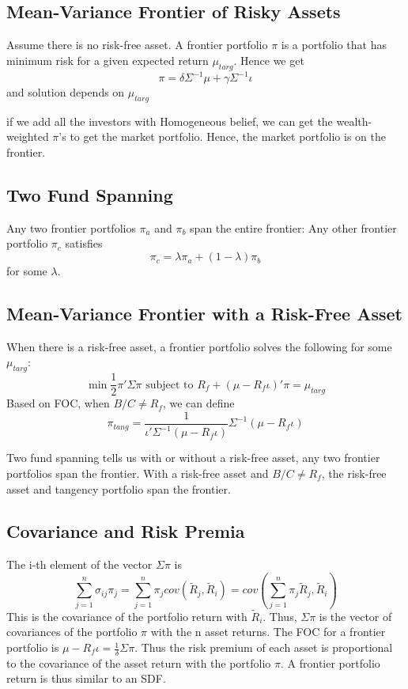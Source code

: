\documentclass[11pt, a4paper, oneside]{article}
\theoremstyle{definition}
\theoremstyle{proposition}
\theoremstyle{corollary}
\theoremstyle{lemma}
\theoremstyle{theorem}
\begin{document}
\subsection{Mean-Variance Frontier of Risky Assets}
Assume there is no risk-free asset. A frontier portfolio $\pi$ is a portfolio that has minimum risk for a given expected return $\mu_{targ}$. Hence we get
$$\pi = \delta\Sigma^{-1}\mu + \gamma \Sigma^{-1}\iota$$ and solution depends on $\mu_{targ}$

if we add all the investors with Homogeneous belief, we can get the wealth-weighted $\pi$'s to get the market portfolio. Hence, the market portfolio is on the frontier. 

\subsection{Two Fund Spanning}
Any two frontier portfolios $\pi_a$ and $\pi_b$ span the entire frontier: Any other frontier portfolio $\pi_c$ satisfies 
$$\pi_c = \lambda \pi_a + (1- \lambda) \pi_b$$
for some $\lambda$. 

\subsection{Mean-Variance Frontier with a Risk-Free Asset}
When there is a risk-free asset, a frontier portfolio solves the following for some $\mu_{targ}$:
$$\min \frac{1}{2}\pi'\Sigma\pi  \text{ subject to } R_f + (\mu - R_f\iota)'\pi = \mu_{targ}$$
Based on FOC, when $B/C \neq R_f$, we can define
$$\pi_{tang} = \frac{1}{\iota'\Sigma^{-1}(\mu- R_f\iota)}\Sigma^{-1}(\mu - R_f \iota)$$

Two fund spanning tells us with or without a risk-free asset, any two frontier portfolios span the frontier. With a risk-free asset and $B/C \neq R_f$, the risk-free asset and tangency portfolio span the frontier. 

\subsection{Covariance and Risk Premia}
The i-th element of the vector $\Sigma \pi$ is 
$$\sum_{j=1}^n \sigma_{ij}\pi_j = \sum_{j=1}^n \pi_j cov(\tilde{R}_j, \tilde{R}_i) = cov\left(\sum_{j=1}^n \pi_j\tilde{R}_j, \tilde{R}_i\right)$$
This is the covariance of the portfolio return with $\tilde{R}_i$. Thus, $\Sigma \pi$ is the vector of covariances of the portfolio $\pi$ with the n asset returns. The FOC for a frontier portfolio is $\mu - R_f\iota = \frac{1}{\delta} \Sigma \pi$. Thus the risk premium of each asset is proportional to the covariance of the asset return with the portfolio $\pi$. A frontier portfolio return is thus similar to an SDF. 
\end{document}
